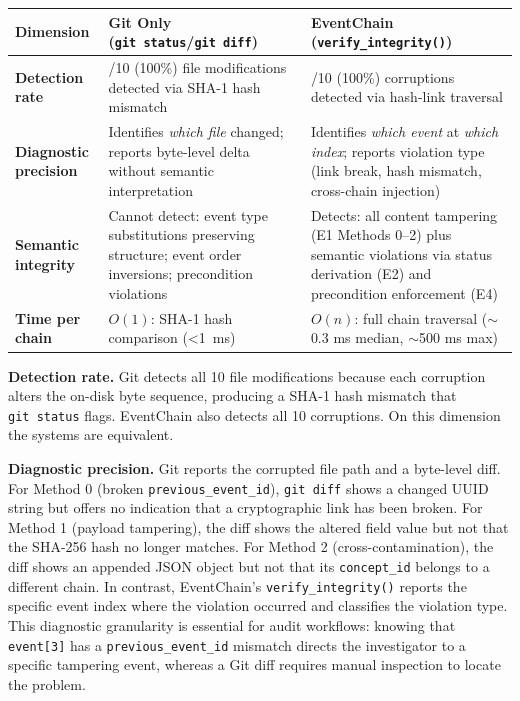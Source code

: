 \begin{longtable}[]{@{}>{\raggedright\arraybackslash}p{}
  >{\raggedright\arraybackslash}p{}
  >{\raggedright\arraybackslash}p{}@{}}
\toprule
Dimension
& Git Only (\texttt{git\ status}/\texttt{git\ diff})
& EventChain (\texttt{verify\_integrity()})
\\
\midrule
\endhead
\bottomrule
\endlastfoot
\textbf{Detection rate} & 10/10 (100\%) file modifications detected via SHA-1 hash mismatch & 10/10 (100\%) corruptions detected via hash-link traversal \\
\textbf{Diagnostic precision} & Identifies \emph{which file} changed; reports byte-level delta without semantic interpretation & Identifies \emph{which event} at \emph{which index}; reports violation type (link break, hash mismatch, cross-chain injection) \\
\textbf{Semantic integrity} & Cannot detect: event type substitutions preserving structure; event order inversions; precondition violations & Detects: all content tampering (E1 Methods 0--2) plus semantic violations via status derivation (E2) and precondition enforcement (E4) \\
\textbf{Time per chain} & \(O(1)\): SHA-1 hash comparison (<1~ms) & \(O(n)\): full chain traversal ($\sim$0.3 ms median, $\sim$500 ms max) \\
\end{longtable}

\textbf{Detection rate.} Git detects all 10 file modifications because each corruption alters the on-disk byte sequence, producing a SHA-1 hash mismatch that \texttt{git\ status} flags. EventChain also detects all 10 corruptions. On this dimension the systems are equivalent.

\textbf{Diagnostic precision.} Git reports the corrupted file path and a byte-level diff. For Method 0 (broken \texttt{previous\_event\_id}), \texttt{git\ diff} shows a changed UUID string but offers no indication that a cryptographic link has been broken. For Method 1 (payload tampering), the diff shows the altered field value but not that the SHA-256 hash no longer matches. For Method 2 (cross-contamination), the diff shows an appended JSON object but not that its \texttt{concept\_id} belongs to a different chain. In contrast, EventChain's \texttt{verify\_integrity()} reports the specific event index where the violation occurred and classifies the violation type. This diagnostic granularity is essential for audit workflows: knowing that \texttt{event{[}3{]}} has a \texttt{previous\_event\_id} mismatch directs the investigator to a specific tampering event, whereas a Git diff requires manual inspection to locate the problem.

